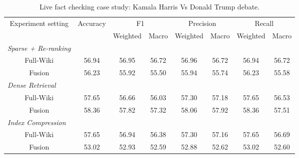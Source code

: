 \begin{table*}[htb!]
\centering
\footnotesize
\begin{tabular}{c c c c c c c c}
\multirow{2}{*}{Experiment setting} & \multirow{2}{*}{Accuracy} & \multicolumn{2}{c}{F1} & \multicolumn{2}{c}{Precision} & \multicolumn{2}{c}{Recall}  \\ 
\cline{3-8}
  & &  Weighted  & Macro & Weighted & Macro & Weighted & Macro      \\
\hline
\multicolumn{1}{l}{\textit{Sparse + Re-ranking}} &  & & & \\
Full-Wiki & 56.94 & 56.95 & 56.72 & 56.96 & 56.72 & 56.94 & 56.72  \\
Fusion & 56.23 & 55.92 & 55.50 & 55.94 & 55.74 & 56.23 & 55.58  \\

\hline
\multicolumn{1}{l}{\textit{Dense Retrieval}} & & & & \\
Full-Wiki & 57.65 & 56.66 & 56.03 & 57.30 & 57.18 & 57.65 & 56.53  \\
Fusion & 58.36 & 57.82 & 57.32 & 58.06 & 57.92  & 58.36 & 57.51 \\

\hline
\multicolumn{1}{l}{\textit{Index Compression}} & & & & & & &  \\
Full-Wiki  & 57.65 & 56.94 & 56.38  &  57.30 & 57.16 & 57.65 & 56.69 \\
Fusion & 53.02 & 52.93 & 52.59  & 52.88 & 52.62 & 53.02 & 52.60  \\
\hline
\end{tabular}
\caption{Live fact checking case study: Kamala Harris Vs Donald Trump debate.}
\label{tab:live_fact_check_performance_metrics}
\vspace{-2em}
\end{table*}
